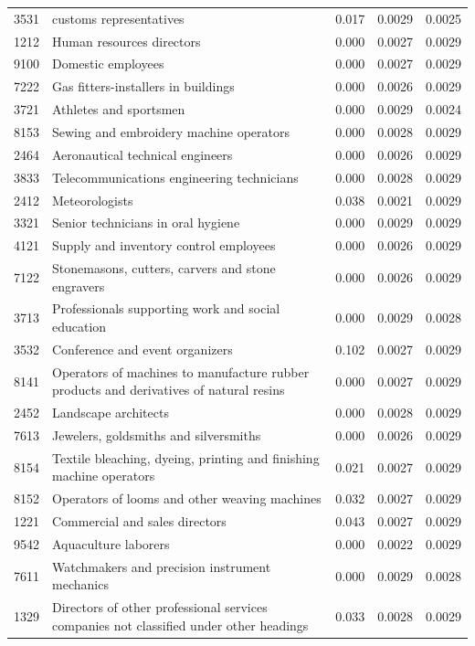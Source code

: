 \begin{longtable}{p{}>{\raggedright\arraybackslash}p{}rrr}
3531 & customs representatives & 0.017 & 0.0029 & 0.0025 \\
1212 & Human resources directors & 0.000 & 0.0027 & 0.0029 \\
9100 & Domestic employees & 0.000 & 0.0027 & 0.0029 \\
7222 & Gas fitters-installers in buildings & 0.000 & 0.0026 & 0.0029 \\
3721 & Athletes and sportsmen & 0.000 & 0.0029 & 0.0024 \\
8153 & Sewing and embroidery machine operators & 0.000 & 0.0028 & 0.0029 \\
2464 & Aeronautical technical engineers & 0.000 & 0.0026 & 0.0029 \\
3833 & Telecommunications engineering technicians & 0.000 & 0.0028 & 0.0029 \\
2412 & Meteorologists & 0.038 & 0.0021 & 0.0029 \\
3321 & Senior technicians in oral hygiene & 0.000 & 0.0029 & 0.0029 \\
4121 & Supply and inventory control employees & 0.000 & 0.0026 & 0.0029 \\
7122 & Stonemasons, cutters, carvers and stone engravers & 0.000 & 0.0026 & 0.0029 \\
3713 & Professionals supporting work and social education & 0.000 & 0.0029 & 0.0028 \\
3532 & Conference and event organizers & 0.102 & 0.0027 & 0.0029 \\
8141 & Operators of machines to manufacture rubber products and derivatives of natural resins & 0.000 & 0.0027 & 0.0029 \\
2452 & Landscape architects & 0.000 & 0.0028 & 0.0029 \\
7613 & Jewelers, goldsmiths and silversmiths & 0.000 & 0.0026 & 0.0029 \\
8154 & Textile bleaching, dyeing, printing and finishing machine operators & 0.021 & 0.0027 & 0.0029 \\
8152 & Operators of looms and other weaving machines & 0.032 & 0.0027 & 0.0029 \\
1221 & Commercial and sales directors & 0.043 & 0.0027 & 0.0029 \\
9542 & Aquaculture laborers & 0.000 & 0.0022 & 0.0029 \\
7611 & Watchmakers and precision instrument mechanics & 0.000 & 0.0029 & 0.0028 \\
1329 & Directors of other professional services companies not classified under other headings & 0.033 & 0.0028 & 0.0029 \\

\end{longtable}
